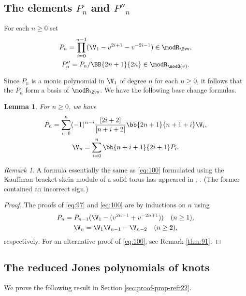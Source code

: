 \documentclass{amsart}
\numberwithin{equation}{section}
\numberwithin{figure}{section}
\theoremstyle{plain}
\newtheorem{lemma}[theorem]{Lemma}
\theoremstyle{definition}
\theoremstyle{remark}
\newtheorem{remark}[theorem]{Remark}
\begin{document}
\subsection{The elements $P_n$ and $P''_n$}
\label{sec:elements-pn-pn}

For each $n\ge 0$ set
\begin{gather*}
  P_n = \prod_{i=0}^{n-1}(\V_1 - v^{2i+1}-v^{-2i-1}) \in \modR _{\Zvv},\\
  P''_n = P_n/\BB{2n+1}{2n}\in \modR _{\modQ (v)}.
\end{gather*}

Since $P_n$ is a monic polynomial in $\V_1$ of degree $n$ for each
$n\ge 0$, it follows that the $P_n$ form a basis of $\modR _{\Zvv}$.  We have
the following base change formulas.

\begin{lemma}
  \label{r16}
  For $n\ge 0$, we have
  \begin{gather}
    \label{eq:97}
    P_n=\sum_{i=0}^n(-1)^{n-i}\frac{[2i+2]}{[n+i+2]}
    \bb{2n+1}{n+1+i}\V_i,\\
    \label{eq:100}
    \V_n =\sum_{i=0}^n \bb{n+i+1}{2i+1} P_i.
  \end{gather}
\end{lemma}

\begin{remark}
  \label{r17}
  A formula essentially the same as \eqref{eq:100} formulated using
  the Kauffman bracket skein module of a solid torus has appeared in
  \cite[Proposition 5.1.]{H:iias2000}, \cite[Equation 47]{Masbaum}.
  (The former contained an incorrect sign.)
\end{remark}

\begin{proof}
  The proofs of \eqref{eq:97} and \eqref{eq:100} are by inductions on $n$
  using
  \begin{gather*}
    P_n=P_{n-1}(\V_1-(v^{2n-1}+v^{-2n+1}))\quad (n\ge 1),\\
    \V_n=\V_1\V_{n-1}-\V_{n-2}\quad (n\ge 2),
  \end{gather*}
  respectively.  For an alternative proof of \eqref{eq:100}, see
  Remark \ref{thm:91}.
\end{proof}

\subsection{The reduced Jones polynomials of knots}
\label{sec:basis-pn-}

We prove the following result in Section \ref{sec:proof-prop-refr22}.
\end{document}
